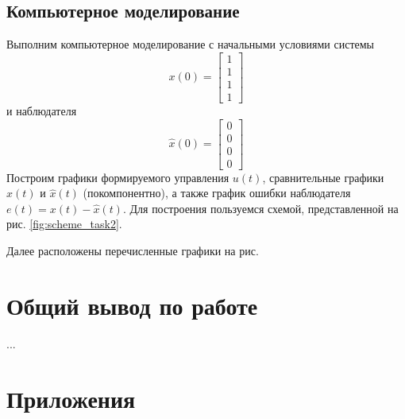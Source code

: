 \documentclass[a4paper, 12pt]{article}
\begin{document}
    \subsection{Компьютерное моделирование}
    Выполним компьютерное моделирование с начальными условиями системы
    $$
    x(0)=\begin{bmatrix}
        1\\1\\1\\1
    \end{bmatrix}
    $$
    и наблюдателя
    $$
    \hat{x}(0)=\begin{bmatrix}
        0\\0\\0\\0
    \end{bmatrix}
    $$
    Построим графики формируемого управления $u(t)$, сравнительные графики $x(t)$ и $\hat{x}(t)$ (покомпонентно),
    а также график ошибки наблюдателя $e(t)=x(t)-\hat{x}(t)$. Для построения пользуемся схемой, представленной на рис. \ref{fig:scheme_task2}.


    Далее расположены перечисленные графики на рис.

    
    \newpage
    


    \section{Общий вывод по работе}
    ...


    \section{Приложения}
\end{document}
